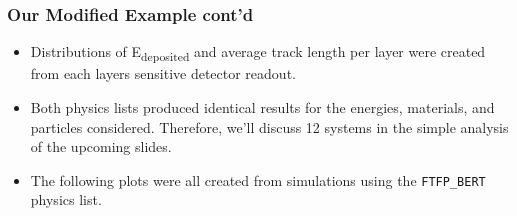 \documentclass[mathserif,18pt,xcolor=table]{beamer}
\begin{document}
\begin{frame}
  \frametitle{Our Modified Example cont'd}
  {\footnotesize
  \begin{itemize}
    \item Distributions of E\textsubscript{deposited} and average track length per layer were created from each layers sensitive detector readout.
    \item Both physics lists produced identical results for the energies, materials, and particles considered. Therefore, we'll discuss 12 systems in the simple analysis of the upcoming slides.
    \item The following plots were all created from simulations using the \texttt{FTFP\_BERT} physics list.
  \end{itemize}}
\end{frame}
\end{document}
